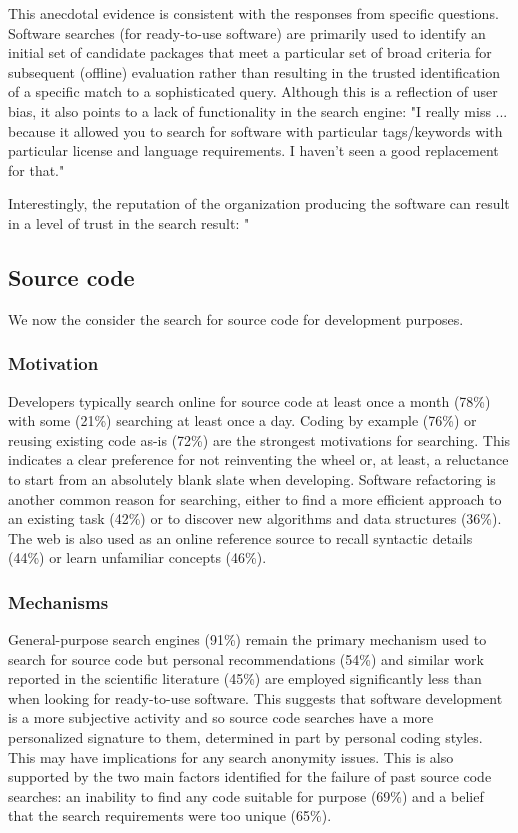 \documentclass{casicswhitepaper}
\begin{document}
This anecdotal evidence is consistent with the responses from specific questions. Software searches (for ready-to-use software) are primarily used to identify an initial set of candidate packages that meet a particular set of broad criteria for subsequent (offline) evaluation rather than resulting in the trusted identification of a specific match to a sophisticated query. Although this is a reflection of user bias, it also points to a lack of functionality in the search engine: "I really miss ... because it allowed you to search for software with particular tags/keywords with particular license and language requirements. I haven't seen a good replacement for that."

Interestingly, the reputation of the organization producing the software can result in a level of trust in the search result: "

\subsection{Source code}

We now the consider the search for source code for development purposes.

\subsubsection{Motivation}

Developers typically search online for source code at least once a month (78\%) with some (21\%) searching at least once a day. Coding by example (76\%) or reusing existing code as-is (72\%) are the strongest motivations for searching. This indicates a clear preference for not reinventing the wheel or, at least, a reluctance to start from an absolutely blank slate when developing. Software refactoring is another common reason for searching, either to find a more efficient approach to an existing task (42\%) or to discover new algorithms and data structures (36\%). The web is also used as an online reference source to recall syntactic details (44\%) or learn unfamiliar concepts (46\%). 

\subsubsection{Mechanisms}

General-purpose search engines (91\%) remain the primary mechanism used to search for source code but personal recommendations (54\%) and similar work reported in the scientific literature (45\%) are employed significantly less than when looking for ready-to-use software. This suggests that software development is a more subjective activity and so source code searches have a more personalized signature to them, determined in part by personal coding styles. This may have implications for any search anonymity issues. This is also supported by the two main factors identified for the failure of past source code searches: an inability to find any code suitable for purpose (69\%) and a belief that the search requirements were too unique (65\%).
\end{document}
